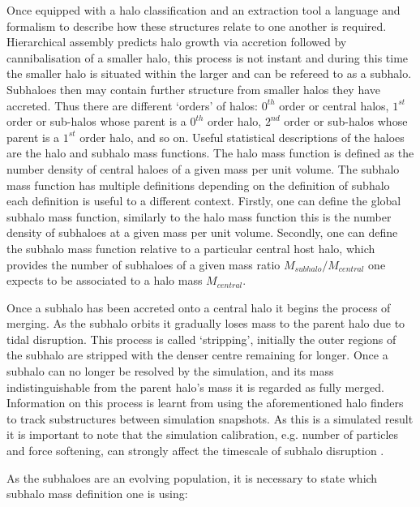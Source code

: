 Once equipped with a halo classification and an extraction tool a language and formalism to describe how these structures relate to one another is required. Hierarchical assembly predicts halo growth via accretion followed by cannibalisation of a smaller halo, this process is not instant and during this time the smaller halo is situated within the larger and can be refereed to as a subhalo. Subhaloes then may contain further structure from smaller halos they have accreted. Thus there are different `orders' of halos: $0^{th}$ order or central halos, $1^{st}$ order or sub-halos whose parent is a $0^{th}$ order halo, $2^{nd}$ order or sub-halos whose parent is a $1^{st}$ order halo, and so on. Useful statistical descriptions of the haloes are the halo and subhalo mass functions. The halo mass function is defined as the number density of central haloes of a given mass per unit volume. The subhalo mass function has multiple definitions depending on the definition of subhalo each definition is useful to a different context. Firstly, one can define the global subhalo mass function, similarly to the halo mass function this is the number density of subhaloes at a given mass per unit volume. Secondly, one can define the subhalo mass function relative to a particular central host halo, which provides the number of subhaloes of a given mass ratio $M_{subhalo}/M_{central}$ one expects to be associated to a halo mass $M_{central}$. 


Once a subhalo has been accreted onto a central halo it begins the process of merging. As the subhalo orbits it gradually loses mass to the parent halo due to tidal disruption. This process is called `stripping', initially the outer regions of the subhalo are stripped with the denser centre remaining for longer. Once a subhalo can no longer be resolved by the simulation, and its mass indistinguishable from the parent halo's mass it is regarded as fully merged. Information on this process is learnt from using the aforementioned halo finders to track substructures between simulation snapshots. As this is a simulated result it is important to note that the simulation calibration, e.g. number of particles and force softening, can strongly affect the timescale of subhalo disruption \cite{vandenBosch2018DarkDisruption}.

As the subhaloes are an evolving population, it is necessary to state which subhalo mass definition one is using:

